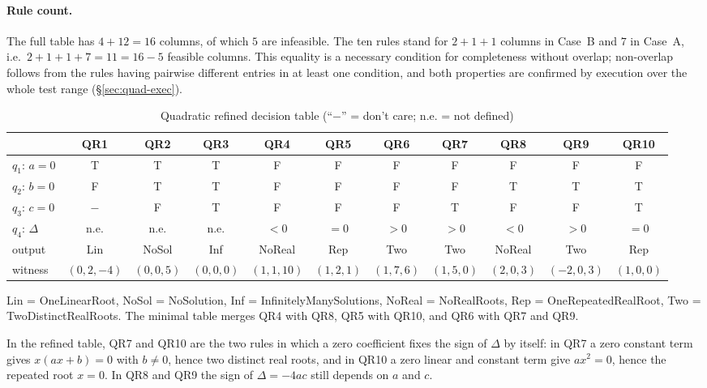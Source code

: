 \documentclass[11pt,a4paper]{article}
\begin{document}
\paragraph{Rule count.} The full table has \(4+12=16\) columns, of which
\(5\) are infeasible. The ten rules stand for \(2+1+1\) columns in Case~B and
\(7\) in Case~A, i.e.\ \(2+1+1+7=11=16-5\) feasible columns. This equality is
a necessary condition for completeness without overlap; non-overlap follows
from the rules having pairwise different entries in at least one condition,
and both properties are confirmed by execution over the whole test range
(\S\ref{sec:quad-exec}).

\begin{table}[H]
\centering
\caption{Quadratic refined decision table (``\(-\)'' = don't care; n.e. = not defined)}
\label{tab:quad-dt}
\footnotesize
\setlength{\tabcolsep}{2.6pt}
\begin{tabular}{l cccccccccc}
\toprule
 & QR1 & QR2 & QR3 & QR4 & QR5 & QR6 & QR7 & QR8 & QR9 & QR10 \\
\midrule
\(q_1\): \(a=0\) & T & T & T & F & F & F & F & F & F & F \\
\(q_2\): \(b=0\) & F & T & T & F & F & F & F & T & T & T \\
\(q_3\): \(c=0\) & \(-\) & F & T & F & F & F & T & F & F & T \\
\(q_4\): \(\Delta\) & n.e. & n.e. & n.e. & \(<0\) & \(=0\) & \(>0\) & \(>0\) & \(<0\) & \(>0\) & \(=0\) \\
\midrule
output & Lin & NoSol & Inf & NoReal & Rep & Two & Two & NoReal & Two & Rep \\
\midrule
witness & \((0,2,-4)\) & \((0,0,5)\) & \((0,0,0)\) & \((1,1,10)\) & \((1,2,1)\) & \((1,7,6)\) & \((1,5,0)\) & \((2,0,3)\) & \((-2,0,3)\) & \((1,0,0)\) \\
\bottomrule
\end{tabular}

\smallskip
\footnotesize Lin = OneLinearRoot, NoSol = NoSolution, Inf = InfinitelyManySolutions,
NoReal = NoRealRoots, Rep = OneRepeatedRealRoot, Two = TwoDistinctRealRoots.
The minimal table merges QR4 with QR8, QR5 with QR10, and QR6 with QR7 and QR9.
\end{table}

In the refined table, QR7 and QR10 are the two rules in which a zero
coefficient fixes the sign of \(\Delta\) by itself: in QR7 a zero constant
term gives \(x(ax+b)=0\) with \(b\ne0\), hence two distinct real roots, and in
QR10 a zero linear and constant term give \(ax^2=0\), hence the repeated root
\(x=0\). In QR8 and QR9 the sign of \(\Delta=-4ac\) still depends on \(a\) and
\(c\).
\end{document}
